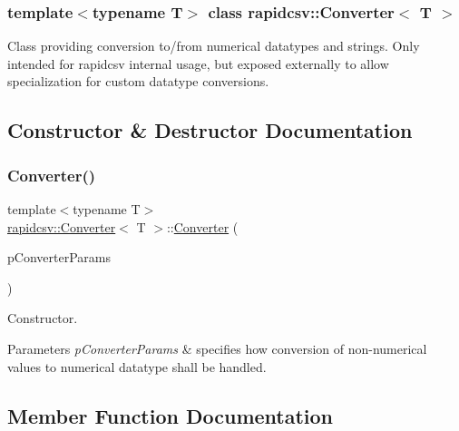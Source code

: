 \subsubsection*{template$<$typename T$>$\newline
class rapidcsv\+::\+Converter$<$ T $>$}

Class providing conversion to/from numerical datatypes and strings. Only intended for rapidcsv internal usage, but exposed externally to allow specialization for custom datatype conversions. 

\subsection{Constructor \& Destructor Documentation}
\mbox{\label{classrapidcsv_1_1Converter_a8f7de9557f32e24abb022bc9d52ae2e2}} 
\subsubsection{\texorpdfstring{Converter()}{Converter()}}
{\footnotesize\ttfamily template$<$typename T$>$ \\
\hyperlink{classrapidcsv_1_1Converter}{rapidcsv\+::\+Converter}$<$ T $>$\+::\hyperlink{classrapidcsv_1_1Converter}{Converter} (\begin{DoxyParamCaption}\item[{const \hyperlink{structrapidcsv_1_1ConverterParams}{Converter\+Params} \&}]{p\+Converter\+Params }\end{DoxyParamCaption})\hspace{0.3cm}{\ttfamily [inline]}}



Constructor. 


\begin{DoxyParams}{Parameters}
{\em p\+Converter\+Params} & specifies how conversion of non-\/numerical values to numerical datatype shall be handled. \\
\hline
\end{DoxyParams}


\subsection{Member Function Documentation}
\mbox{\label{classrapidcsv_1_1Converter_a114b87c39563c7777ad79fa8eb50c8e5}} 
